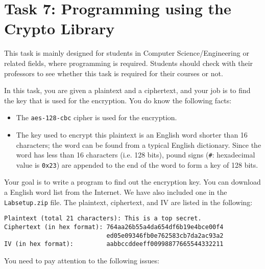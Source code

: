 \section{Task 7: Programming using the Crypto Library}

This task is mainly designed for students in Computer Science/Engineering
or related fields, where programming is required. Students should
check with their professors to see whether this task is required
for their courses or not.


In this task, you are given a plaintext and a ciphertext, and
your job is to find the key that is used for the encryption.
You do know the following facts:

\begin{itemize}
\item The {\tt aes-128-cbc} cipher is used for the encryption.
\item The key used to encrypt this plaintext is an English
word shorter than 16 characters; the word can be found from a typical
English dictionary.  Since the word has less than 16 characters (i.e. 128
bits), pound signs (\texttt{\#}: hexadecimal value is \texttt{0x23})
are appended to the end of the word to form a key of 128 bits.
\end{itemize}


Your goal is to write a program to
find out the encryption key. You can download a English word list
from the Internet.  We have also included one in
the \texttt{Labsetup.zip} file.
The plaintext, ciphertext, and IV are listed in the following:


\begin{lstlisting}
Plaintext (total 21 characters): This is a top secret.
Ciphertext (in hex format): 764aa26b55a4da654df6b19e4bce00f4
                            ed05e09346fb0e762583cb7da2ac93a2
IV (in hex format):         aabbccddeeff00998877665544332211
\end{lstlisting}



You need to pay attention to the following issues:

